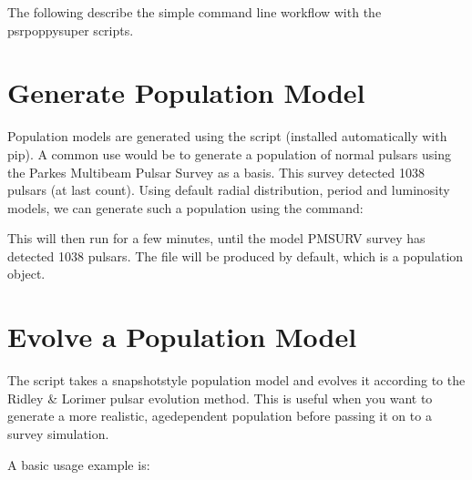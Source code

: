 \documentclass[letterpaper,10pt,english]{sphinxmanual}
\begin{document}
\sphinxAtStartPar
The following describe the simple command line workflow with the psrpoppysuper scripts.


\section{Generate Population Model}
\label{\detokenize{tutorial-basic:generate-population-model}}\label{\detokenize{tutorial-basic:generate-population}}
\sphinxAtStartPar
Population models are generated using the  script (installed
automatically with pip). A common use would be to generate a population of
normal pulsars using the Parkes Multibeam Pulsar Survey as a basis. This
survey detected 1038 pulsars (at last count). Using default radial distribution,
period and luminosity models, we can generate such a population using the command:

\begin{sphinxVerbatim}[commandchars=\\\{\}]
    
\end{sphinxVerbatim}

\sphinxAtStartPar
This will then run for a few minutes, until the model PMSURV survey
has detected 1038 pulsars. The file  will be produced
by default, which is a 
population object.


\section{Evolve a Population Model}
\label{\detokenize{tutorial-basic:evolve-a-population-model}}\label{\detokenize{tutorial-basic:evolve-population}}
\sphinxAtStartPar
The  script takes a snapshot\sphinxhyphen{}style population model and evolves
it according to the Ridley \& Lorimer pulsar evolution method. This is
useful when you want to generate a more realistic, age\sphinxhyphen{}dependent
population before passing it on to a survey simulation.

\sphinxAtStartPar
A basic usage example is:

\begin{sphinxVerbatim}[commandchars=\\\{\}]
        
\end{sphinxVerbatim}
\end{document}
